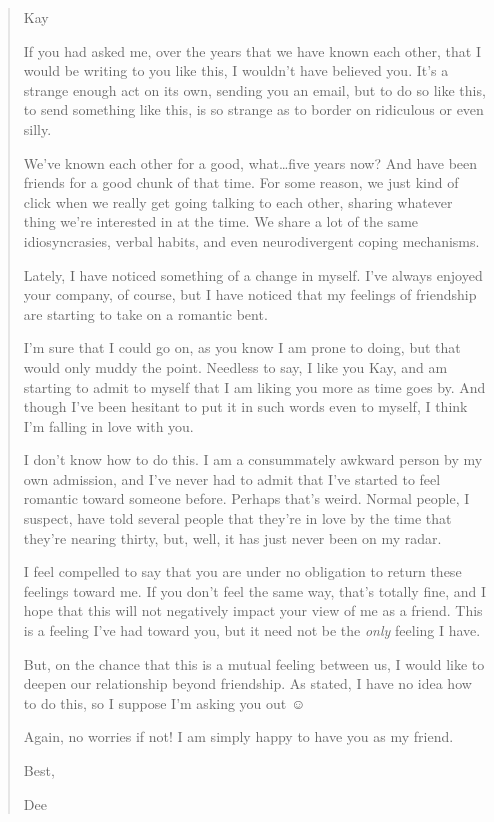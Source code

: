 \begin{quote}
Kay

If you had asked me, over the years that we have known each other, that I would be writing to you like this, I wouldn't have believed you. It's a strange enough act on its own, sending you an email, but to do so like this, to send something like this, is so strange as to border on ridiculous or even silly.

We've known each other for a good, what\ldots five years now? And have been friends for a good chunk of that time. For some reason, we just kind of click when we really get going talking to each other, sharing whatever thing we're interested in at the time. We share a lot of the same idiosyncrasies, verbal habits, and even neurodivergent coping mechanisms.

Lately, I have noticed something of a change in myself. I've always enjoyed your company, of course, but I have noticed that my feelings of friendship are starting to take on a romantic bent.

I'm sure that I could go on, as you know I am prone to doing, but that would only muddy the point. Needless to say, I like you Kay, and am starting to admit to myself that I am liking you more as time goes by. And though I've been hesitant to put it in such words even to myself, I think I'm falling in love with you.

I don't know how to do this. I am a consummately awkward person by my own admission, and I've never had to admit that I've started to feel romantic toward someone before. Perhaps that's weird. Normal people, I suspect, have told several people that they're in love by the time that they're nearing thirty, but, well, it has just never been on my radar.

I feel compelled to say that you are under no obligation to return these feelings toward me. If you don't feel the same way, that's totally fine, and I hope that this will not negatively impact your view of me as a friend. This is a feeling I've had toward you, but it need not be the \emph{only} feeling I have.

But, on the chance that this is a mutual feeling between us, I would like to deepen our relationship beyond friendship. As stated, I have no idea how to do this, so I suppose I'm asking you out ☺

Again, no worries if not! I am simply happy to have you as my friend.

Best,

Dee
\end{quote}

